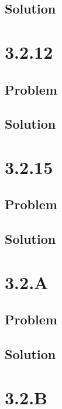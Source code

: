 \documentclass[12pt]{article}
\begin{document}
\subsection*{Solution}




\section*{3.2.12}

\subsection*{Problem}

\subsection*{Solution}




\section*{3.2.15}

\subsection*{Problem}

\subsection*{Solution}




\section*{3.2.A}

\subsection*{Problem}

\subsection*{Solution}




\section*{3.2.B}
\end{document}
